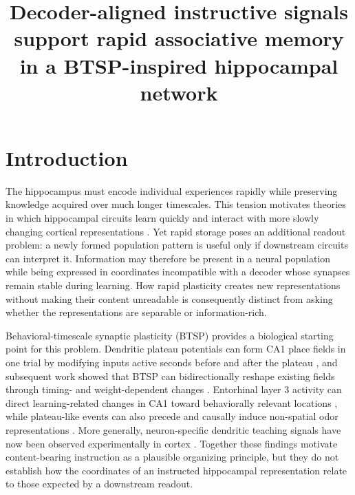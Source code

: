 \documentclass[11pt]{article}
\title{Decoder-aligned instructive signals support rapid associative memory in a BTSP-inspired hippocampal network}
\author{}
\date{}
\begin{document}
\maketitle

\section{Introduction}

The hippocampus must encode individual experiences rapidly while preserving knowledge acquired over much longer timescales. This tension motivates theories in which hippocampal circuits learn quickly and interact with more slowly changing cortical representations \citep{marr1971,mcclelland1995,schapiro2017}. Yet rapid storage poses an additional readout problem: a newly formed population pattern is useful only if downstream circuits can interpret it. Information may therefore be present in a neural population while being expressed in coordinates incompatible with a decoder whose synapses remain stable during learning. How rapid plasticity creates new representations without making their content unreadable is consequently distinct from asking whether the representations are separable or information-rich.

Behavioral-timescale synaptic plasticity (BTSP) provides a biological starting point for this problem. Dendritic plateau potentials can form CA1 place fields in one trial by modifying inputs active seconds before and after the plateau \citep{bittner2017}, and subsequent work showed that BTSP can bidirectionally reshape existing fields through timing- and weight-dependent changes \citep{milstein2021}. Entorhinal layer 3 activity can direct learning-related changes in CA1 toward behaviorally relevant locations \citep{grienberger2022}, while plateau-like events can also precede and causally induce non-spatial odor representations \citep{dorian2026a}. More generally, neuron-specific dendritic teaching signals have now been observed experimentally in cortex \citep{francioni2026}. Together these findings motivate content-bearing instruction as a plausible organizing principle, but they do not establish how the coordinates of an instructed hippocampal representation relate to those expected by a downstream readout.
\end{document}
